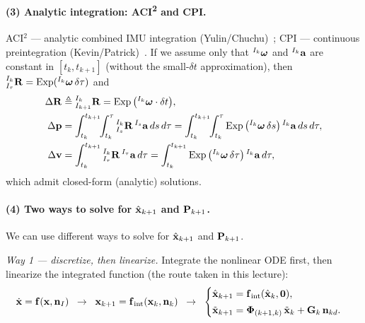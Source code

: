 \paragraph{(3) Analytic integration: ACI\textsuperscript{2} and CPI.} ACI$^2$ --- analytic combined IMU integration (Yulin/Chuchu)~\cite{Yang2020ACI2}; CPI --- continuous preintegration (Kevin/Patrick)~\cite{Eckenhoff2019IJRR,Eckenhoff2017ICRA}. If we assume only that ${}^{I_k}\boldsymbol{\mathbf{\omega}}$ and ${}^{I_k}\boldsymbol{\mathbf{a}}$ are constant in $[t_k, t_{k+1}]$ (without the small-$\delta t$ approximation), then ${}^{I_k}_{I_\tau}\boldsymbol{\mathbf{R}} = \operatorname{Exp}({}^{I_k}\boldsymbol{\mathbf{\omega}}\,\delta\tau)$ and
\begin{align}
\Delta\boldsymbol{\mathbf{R}} &\triangleq {}^{I_k}_{I_{k+1}}\boldsymbol{\mathbf{R}} = \operatorname{Exp}\big({}^{I_k}\boldsymbol{\mathbf{\omega}}\cdot\delta t\big), \\
\Delta\boldsymbol{\mathbf{p}} &= \int_{t_k}^{t_{k+1}}\!\!\int_{t_k}^{\tau} {}^{I_k}_{I_s}\boldsymbol{\mathbf{R}}\,{}^{I_s}\boldsymbol{\mathbf{a}}\,ds\,d\tau
= \int_{t_k}^{t_{k+1}}\!\!\int_{t_k}^{\tau} \operatorname{Exp}\big({}^{I_k}\boldsymbol{\mathbf{\omega}}\,\delta s\big)\,{}^{I_k}\boldsymbol{\mathbf{a}}\,ds\,d\tau, \\
\Delta\boldsymbol{\mathbf{v}} &= \int_{t_k}^{t_{k+1}} {}^{I_k}_{I_\tau}\boldsymbol{\mathbf{R}}\,{}^{I_\tau}\boldsymbol{\mathbf{a}}\,d\tau
= \int_{t_k}^{t_{k+1}} \operatorname{Exp}\big({}^{I_k}\boldsymbol{\mathbf{\omega}}\,\delta\tau\big)\,{}^{I_k}\boldsymbol{\mathbf{a}}\,d\tau,
\end{align}
which admit closed-form (analytic) solutions.

\paragraph{(4) Two ways to solve for $\hat{\boldsymbol{\mathbf{x}}}_{k+1}$ and $\boldsymbol{\mathbf{P}}_{k+1}$.} We can use different ways to solve for $\hat{\boldsymbol{\mathbf{x}}}_{k+1}$ and $\boldsymbol{\mathbf{P}}_{k+1}$.

\emph{Way 1 --- discretize, then linearize.} Integrate the nonlinear ODE first, then linearize the integrated function (the route taken in this lecture):
\begin{align}
\dot{\boldsymbol{\mathbf{x}}} = \boldsymbol{\mathbf{f}}(\boldsymbol{\mathbf{x}},\boldsymbol{\mathbf{n}}_I)
\;\;\to\;\;
\boldsymbol{\mathbf{x}}_{k+1} = \boldsymbol{\mathbf{f}}_{\mathrm{int}}(\boldsymbol{\mathbf{x}}_k,\boldsymbol{\mathbf{n}}_k)
\;\;\to\;\;
\begin{cases}
\hat{\boldsymbol{\mathbf{x}}}_{k+1} = \boldsymbol{\mathbf{f}}_{\mathrm{int}}(\hat{\boldsymbol{\mathbf{x}}}_k,\boldsymbol{\mathbf{0}}), \\[2pt]
\tilde{\boldsymbol{\mathbf{x}}}_{k+1} = \boldsymbol{\mathbf{\Phi}}_{(k+1,k)}\,\tilde{\boldsymbol{\mathbf{x}}}_k + \boldsymbol{\mathbf{G}}_k\,\boldsymbol{\mathbf{n}}_{kd}.
\end{cases}
\end{align}


